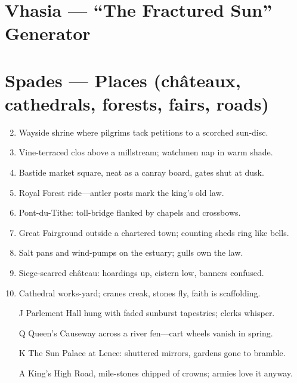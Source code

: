 \section{Vhasia --- ``The Fractured Sun'' Generator}
\label{chap:vhasia}

\section*{Spades --- Places (châteaux, cathedrals, forests, fairs, roads)}
\label{sec:vhasia-places}
\begin{enumerate}
\setcounter{enumi}{1}
\item Wayside shrine where pilgrims tack petitions to a scorched sun-disc.
\item Vine-terraced clos above a millstream; watchmen nap in warm shade.
\item Bastide market square, neat as a canray board, gates shut at dusk.
\item Royal Forest ride---antler posts mark the king's old law.
\item Pont-du-Tithe: toll-bridge flanked by chapels and crossbows.
\item Great Fairground outside a chartered town; counting sheds ring like bells.
\item Salt pans and wind-pumps on the estuary; gulls own the law.
\item Siege-scarred château: hoardings up, cistern low, banners confused.
\item Cathedral works-yard; cranes creak, stones fly, faith is scaffolding.
\item[J] Parlement Hall hung with faded sunburst tapestries; clerks whisper.
\item[Q] Queen's Causeway across a river fen---cart wheels vanish in spring.
\item[K] The Sun Palace at Lence: shuttered mirrors, gardens gone to bramble.
\item[A] King's High Road, mile-stones chipped of crowns; armies love it anyway.
\end{enumerate}

